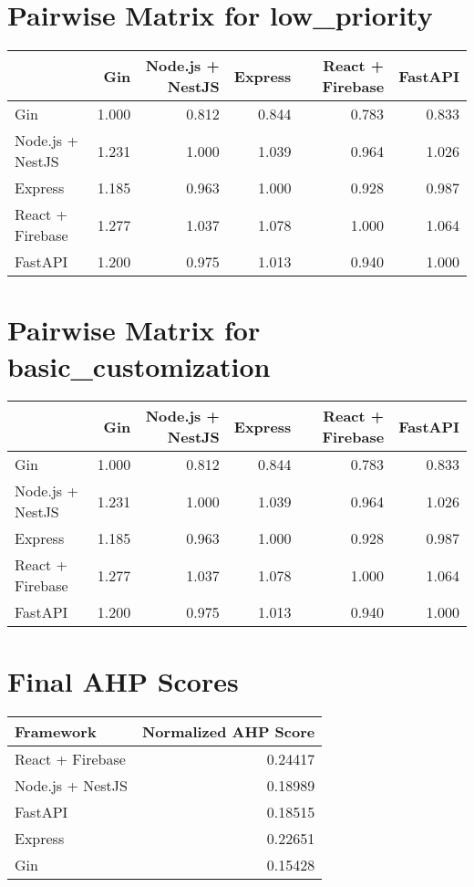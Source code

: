 \documentclass{article}
\begin{document}
\section*{Pairwise Matrix for low\_priority}
\begin{longtable}{l r r r r r} 
\toprule
 & Gin & Node.js + NestJS & Express & React + Firebase & FastAPI \\ \midrule
Gin & 1.000 & 0.812 & 0.844 & 0.783 & 0.833 \\
Node.js + NestJS & 1.231 & 1.000 & 1.039 & 0.964 & 1.026 \\
Express & 1.185 & 0.963 & 1.000 & 0.928 & 0.987 \\
React + Firebase & 1.277 & 1.037 & 1.078 & 1.000 & 1.064 \\
FastAPI & 1.200 & 0.975 & 1.013 & 0.940 & 1.000 \\
\bottomrule \end{longtable}
\section*{Pairwise Matrix for basic\_customization}
\begin{longtable}{l r r r r r} 
\toprule
 & Gin & Node.js + NestJS & Express & React + Firebase & FastAPI \\ \midrule
Gin & 1.000 & 0.812 & 0.844 & 0.783 & 0.833 \\
Node.js + NestJS & 1.231 & 1.000 & 1.039 & 0.964 & 1.026 \\
Express & 1.185 & 0.963 & 1.000 & 0.928 & 0.987 \\
React + Firebase & 1.277 & 1.037 & 1.078 & 1.000 & 1.064 \\
FastAPI & 1.200 & 0.975 & 1.013 & 0.940 & 1.000 \\
\bottomrule \end{longtable}
\section*{Final AHP Scores}
\begin{longtable}{l r} \toprule Framework & Normalized AHP Score \\ \midrule
React + Firebase & 0.24417 \\
Node.js + NestJS & 0.18989 \\
FastAPI & 0.18515 \\
Express & 0.22651 \\
Gin & 0.15428 \\
\bottomrule \end{longtable}
\end{document}
